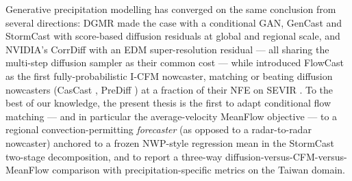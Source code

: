 Generative precipitation modelling has converged on the same conclusion from several directions: DGMR \citep{ravuri2021dgmr} made the case with a conditional GAN, GenCast \citep{price2024gencast} and StormCast \citep{pathak2024stormcast} with score-based diffusion residuals at global and regional scale, and NVIDIA's CorrDiff \citep{mardani2024corrdiff} with an EDM super-resolution residual --- all sharing the multi-step diffusion sampler as their common cost --- while \citet{ribeiro2025flowcast} introduced FlowCast as the first fully-probabilistic I-CFM nowcaster, matching or beating diffusion nowcasters (CasCast \citep{gong2024cascast}, PreDiff \citep{gao2023prediff}) at a fraction of their NFE on SEVIR \citep{veillette2020sevir}. To the best of our knowledge, the present thesis is the first to adapt conditional flow matching --- and in particular the average-velocity MeanFlow objective \citep{geng2025meanflow} --- to a regional convection-permitting \emph{forecaster} (as opposed to a radar-to-radar nowcaster) anchored to a frozen NWP-style regression mean in the StormCast two-stage decomposition, and to report a three-way diffusion-versus-CFM-versus-MeanFlow comparison with precipitation-specific metrics on the Taiwan domain.
